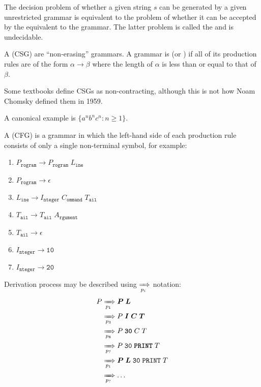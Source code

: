 \documentclass{article}
\begin{document}
The decision problem of whether a given string $s$ can be generated by a given unrestricted grammar is equivalent to the problem of whether it can be accepted by the  equivalent to the grammar. The latter problem is called the  and is undecidable.
\plush{}


A  (CSG) are ``non-erasing'' grammars. A grammar is  (or ) if all of its production rules are of the form \(\alpha \to \beta\) where the length of \(\alpha\) is less than or equal to that of \(\beta\).

Some textbooks define CSGs as non-contracting, although this is not how Noam Chomsky defined them in 1959.

A canonical example is \(\{ a^nb^nc^n : n \geq 1 \}\).
\plush{}


A  (CFG) is a grammar in which the left-hand side of each production rule consists of only a single non-terminal symbol, for example:
\begin{enumerate}
\setlength\itemsep{0pt}
    \item[$p_1$:] $P_\texttt{rogram} \to P_\texttt{rogram} \; L_\texttt{ine}$
    \item[$p_2$:] $P_\texttt{rogram} \to \epsilon$
    \item[$p_3$:] $L_\texttt{ine} \to I_\texttt{nteger} \; C_\texttt{ommand} \; T_\texttt{ail}$
    \item[$p_4$:] $T_\texttt{ail} \to T_\texttt{ail} \; A_\texttt{rgument}$
    \item[$p_5$:] $T_\texttt{ail} \to \epsilon$
    \item[$p_6$:] $I_\texttt{nteger} \to \texttt{10}$
    \item[$p_7$:] $I_\texttt{nteger} \to \texttt{20}$
\end{enumerate}
\plush{}

Derivation process may be described using $\xRightarrow[p_i]{}$ notation:
\begin{equation*}
\begin{split}
P &\xRightarrow[p_1]{} \bm{P} \; \bm{L} \\
  &\xRightarrow[p_3]{} P \; \bm{I} \; \bm{C} \; \bm{T} \\
  &\xRightarrow[p_8]{} P \; \textbf{\texttt{30}} \; C \; T \\
  &\xRightarrow[p_?]{} P \; \texttt{30} \; \textbf{\texttt{PRINT}} \; T \\
  &\xRightarrow[p_1]{} \bm{P} \; \bm{L} \; \texttt{30} \; \texttt{PRINT} \; T \\
  &\xRightarrow[p_?]{} \dots \\
\end{split}
\end{equation*}
\plush{}
\end{document}
